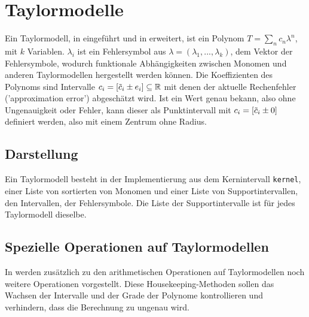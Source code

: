 \chapter{Taylormodelle}

Ein Taylormodell, in \cite{makino2001} eingeführt und in \cite{DBLP:conf/macis/BrausseKM15} erweitert, ist ein Polynom $T = \sum_n c_n \lambda^n$, mit $k$ Variablen. $\lambda_i$ ist ein Fehlersymbol aus $\lambda = (\lambda_1, ... , \lambda_k)$, dem Vektor der Fehlersymbole, wodurch funktionale Abhängigkeiten zwischen Monomen und anderen Taylormodellen hergestellt werden können. Die Koeffizienten des Polynoms sind Intervalle $c_i = [\Tilde{c}_i \pm e_i] \subseteq \mathbb{R}$ mit denen der aktuelle Rechenfehler ('approximation error') abgeschätzt wird. Ist ein Wert genau bekann, also ohne Ungenauigkeit oder Fehler, kann dieser als Punktintervall mit $c_i = [\Tilde{c}_i \pm 0]$ definiert werden, also mit einem Zentrum ohne Radius.


\section{Darstellung}
Ein Taylormodell besteht in der Implementierung aus dem Kernintervall \verb+kernel+, einer Liste von sortierten von Monomen und einer Liste von Supportintervallen, den Intervallen, der Fehlersymbole. Die Liste der Supportintervalle ist für jedes Taylormodell dieselbe.


\section{Spezielle Operationen auf Taylormodellen}
In \cite{DBLP:conf/macis/BrausseKM15} werden zusätzlich zu den arithmetischen Operationen auf Taylormodellen noch weitere Operationen vorgestellt. Diese Housekeeping-Methoden sollen das Wachsen der Intervalle und der Grade der Polynome kontrollieren und verhindern, dass die Berechnung zu ungenau wird.
